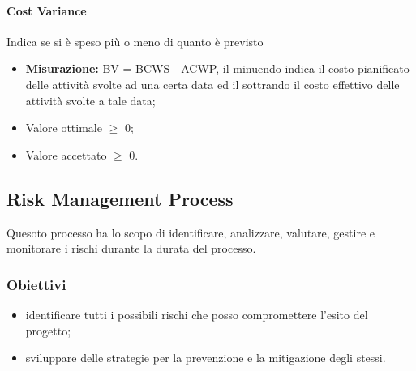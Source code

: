 		\paragraph{Cost Variance}
		Indica se si è speso più o meno di quanto è previsto
		\begin{itemize}
			\item \textbf{Misurazione: } BV = BCWS - ACWP, il minuendo indica il costo pianificato delle attività svolte ad una certa data ed il sottrando il costo effettivo delle attività svolte a tale data;
			\item Valore ottimale $\geq$ 0;
			\item Valore accettato $\geq$ 0.
		\end{itemize}

	\subsection{Risk Management Process}
Quesoto processo ha lo scopo di identificare, analizzare, valutare, gestire e monitorare i rischi durante la durata del processo.
\subsubsection{Obiettivi}
\begin{itemize}
	\item identificare tutti i possibili rischi che posso compromettere l'esito del progetto;
	\item sviluppare delle strategie per la prevenzione e la mitigazione degli stessi.
\end{itemize}
